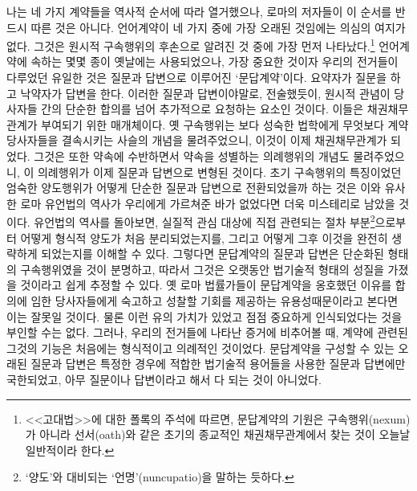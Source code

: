 나는 네 가지 계약들을 역사적 순서에 따라 열거했으나,
로마의  저자들이 이 순서를 반드시 따른 것은 아니다.
언어계약이 네 가지 중에 가장 오래된 것임에는 의심의 여지가 없다.
그것은 원시적 구속행위의 후손으로 알려진 것 중에 가장 먼저 나타났다.\footnote{%
  <<고대법>>에 대한 폴록의 주석에 따르면,
  문답계약의 기원은 구속행위(nexum)가 아니라
  선서(oath)와 같은 초기의 종교적인 채권채무관계에서 찾는 것이
  오늘날
  일반적이라 한다.
  }
언어계약에 속하는 몇몇 종이 옛날에는 사용되었으나,
가장 중요한 것이자 우리의 전거들이 다루었던 유일한 것은
질문과 답변으로 이루어진 `문답계약'이다.
요약자가 질문을 하고 낙약자가 답변을 한다.
이러한 질문과 답변이야말로, 전술했듯이,
원시적 관념이
당사자들 간의 단순한 합의를 넘어 추가적으로 요청하는 요소인 것이다.
이들은 채권채무관계가 부여되기 위한 매개체이다.
옛 구속행위는
보다 성숙한 법학에게 무엇보다
계약당사자들을 결속시키는 사슬의 개념을 물려주었으니,
이것이 이제 채권채무관계가 되었다.
그것은 또한 약속에 수반하면서 약속을 성별하는
의례행위의 개념도 물려주었으니,
이 의례행위가 이제 질문과 답변으로 변형된 것이다.
초기 구속행위의 특징이었던 엄숙한 양도행위가
어떻게 단순한 질문과 답변으로 전환되었을까 하는 것은
이와 유사한 로마 유언법의 역사가 우리에게 가르쳐준 바가 없었다면
더욱 미스테리로 남았을 것이다.
유언법의 역사를 돌아보면,
실질적 관심 대상에 직접 관련되는 절차 부분\footnote{%
  `양도'와 대비되는 `언명'(nuncupatio)을 말하는 듯하다.
}으로부터
어떻게
형식적 양도가
처음 분리되었는지를,
그리고 어떻게 그후 이것을 완전히 생략하게 되었는지를
이해할 수 있다.
그렇다면
문답계약의 질문과 답변은 단순화된 형태의 구속행위였을 것이 분명하고,
따라서
그것은 오랫동안 법기술적 형태의 성질을 가졌을 것이라고 쉽게 추정할 수 있다.
옛 로마 법률가들이 문답계약을 옹호했던 이유를
합의에 임한 당사자들에게 숙고하고 성찰할 기회를 제공하는
유용성때문이라고 본다면 이는 잘못일 것이다.
물론 이런 유의 가치가 있었고 점점 중요하게
인식되었다는 것을 부인할 수는 없다.
그러나, 우리의 전거들에 나타난 증거에 비추어볼 때,
계약에 관련된 그것의 기능은 처음에는 형식적이고 의례적인 것이었다.
문답계약을 구성할 수 있는 오래된 질문과 답변은
특정한 경우에 적합한 법기술적 용어들을 사용한
질문과 답변에만 국한되었고,
아무 질문이나 답변이라고 해서 다 되는 것이 아니었다.

